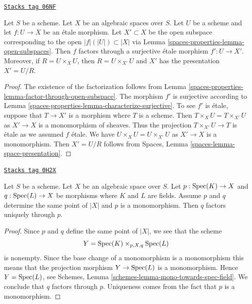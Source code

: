 \begin{lemma}
\label{spaces-properties-lemma-etale-image-open}
\href{https://stacks.math.columbia.edu/tag/06NF}{\texttt{Stacks tag 06NF}}

Let $S$ be a scheme. Let $X$ be an algebraic spaces over $S$.
Let $U$ be a scheme and let $f : U \to X$ be an \'etale morphism.
Let $X' \subset X$ be the open subspace corresponding to
the open $|f|(|U|) \subset |X|$ via
Lemma \ref{spaces-properties-lemma-open-subspaces}.
Then $f$ factors through a surjective \'etale morphism $f' : U \to X'$.
Moreover, if $R = U \times_X U$, then $R = U \times_{X'} U$ and $X'$ has
the presentation $X' = U/R$.
\end{lemma}

\begin{proof}
The existence of the factorization follows from
Lemma \ref{spaces-properties-lemma-factor-through-open-subspace}.
The morphism $f'$ is surjective according to
Lemma \ref{spaces-properties-lemma-characterize-surjective}.
To see $f'$ is \'etale, suppose that $T \to X'$ is a morphism
where $T$ is a scheme. Then $T \times_X U = T \times_{X'} U$
as $X' \to X$ is a monomorphism of sheaves. Thus the projection
$T \times_{X'} U \to T$ is \'etale as we assumed $f$ \'etale.
We have $U \times_X U = U \times_{X'} U$ as $X' \to X$ is a monomorphism.
Then $X' = U/R$ follows from
Spaces, Lemma \ref{spaces-lemma-space-presentation}.
\end{proof}

\begin{lemma}
\label{spaces-properties-lemma-equivalence-class-point-monomorphism}
\href{https://stacks.math.columbia.edu/tag/0H2X}{\texttt{Stacks tag 0H2X}}

Let $S$ be a scheme. Let $X$ be an algebraic space over $S$.
Let $p : \operatorname{Spec}(K) \to X$ and $q : \operatorname{Spec}(L) \to X$
be morphisms where $K$ and $L$ are fields. Assume $p$ and $q$
determine the same point of $|X|$ and $p$ is a monomorphism.
Then $q$ factors uniquely through $p$.
\end{lemma}

\begin{proof}
Since $p$ and $q$ define the same point of $|X|$, we see that the scheme
$$
Y = \operatorname{Spec}(K) \times_{p, X, q} \operatorname{Spec}(L)
$$
is nonempty. Since the base change of a monomorphism is a monomorphism
this means that the projection morphism $Y \to \operatorname{Spec}(L)$
is a monomorphism. Hence $Y = \operatorname{Spec}(L)$, see
Schemes, Lemma \ref{schemes-lemma-mono-towards-spec-field}.
We conclude that $q$ factors through $p$. Uniqueness
comes from the fact that $p$ is a monomorphism.
\end{proof}

